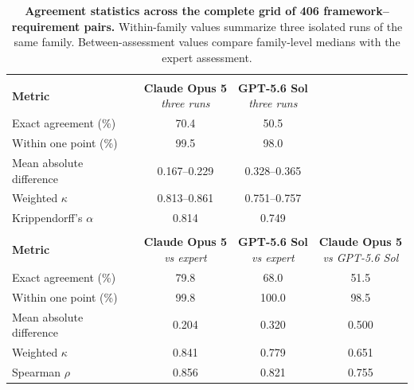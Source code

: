 \begin{table}[H]
\centering
\caption{\textbf{Agreement statistics across the complete grid of 406
framework--requirement pairs.} Within-family values summarize three isolated runs of
the same family. Between-assessment values compare family-level medians with the
expert assessment.}
\label{tab:agreement}
\footnotesize
\setlength{\tabcolsep}{3pt}
\renewcommand{\arraystretch}{1.15}

\begin{tabularx}{\columnwidth}{@{}>{\raggedright\arraybackslash}Xccc@{}}
\toprule
\rowcolor{gray!15}
\multicolumn{4}{@{}l@{}}{\textbf{Within-family reproducibility}
\enspace\textit{(three runs per model)}} \\
\addlinespace[3pt]
\textbf{Metric} & \makecell{\textbf{Claude Opus 5}\\\textit{three runs}} &
\makecell{\textbf{GPT-5.6 Sol}\\\textit{three runs}} & \\
\midrule
Exact agreement (\%) & 70.4 & 50.5 & \\
Within one point (\%) & 99.5 & 98.0 & \\
Mean absolute difference & 0.167--0.229 & 0.328--0.365 & \\
Weighted $\kappa$ & 0.813--0.861 & 0.751--0.757 & \\
Krippendorff's $\alpha$ & 0.814 & 0.749 & \\
\midrule
\rowcolor{gray!15}
\multicolumn{4}{@{}l@{}}{\textbf{Between-assessment agreement}
\enspace\textit{(family medians)}} \\
\addlinespace[3pt]
\textbf{Metric} & \makecell{\textbf{Claude Opus 5}\\\textit{vs expert}} &
\makecell{\textbf{GPT-5.6 Sol}\\\textit{vs expert}} &
\makecell{\textbf{Claude Opus 5}\\\textit{vs GPT-5.6 Sol}} \\
\midrule
Exact agreement (\%) & 79.8 & 68.0 & 51.5 \\
Within one point (\%) & 99.8 & 100.0 & 98.5 \\
Mean absolute difference & 0.204 & 0.320 & 0.500 \\
Weighted $\kappa$ & 0.841 & 0.779 & 0.651 \\
Spearman $\rho$ & 0.856 & 0.821 & 0.755 \\
\bottomrule
\end{tabularx}
\end{table}